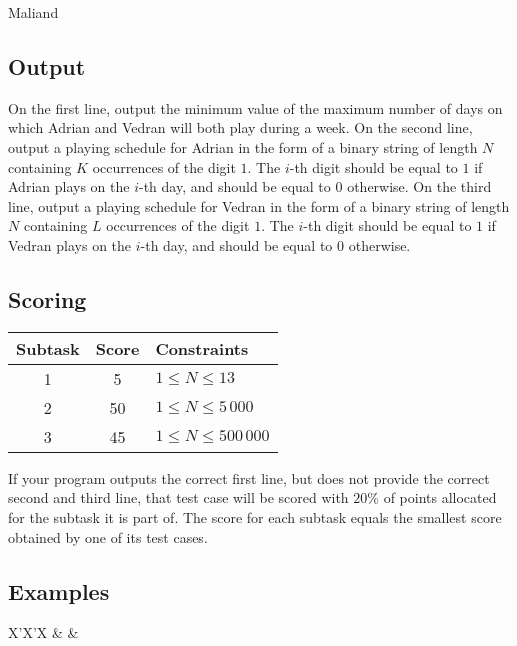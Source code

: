 \begin{statement}[
  problempoints=100,
  timelimit=2 seconds,
  memorylimit=512 MiB,
]{Maliand}
\subsection*{Output}

On the first line, output the minimum value of the maximum number of days on which Adrian and Vedran will both play during a week. On the second line, output a playing schedule for Adrian in the form of a binary string of length $N$ containing $K$ occurrences of the digit $1$. The $i$-th digit should be equal to $1$ if Adrian plays on the $i$-th day, and should be equal to $0$ otherwise. On the third line, output a playing schedule for Vedran in the form of a binary string of length $N$ containing $L$ occurrences of the digit $1$. The $i$-th digit should be equal to $1$ if Vedran plays on the $i$-th day, and should be equal to $0$ otherwise.

\subsection*{Scoring}
{\renewcommand{\arraystretch}{1.4}
  \setlength{\tabcolsep}{6pt}
  \begin{tabular}{ccl}
 Subtask & Score & Constraints \\ \midrule
  1 & 5 & $1 \le N \le 13$\\
  2 & 50 & $1 \le N \le 5\,000$\\
  3 & 45 & $1 \le N \le 500\,000$\\
\end{tabular}}

If your program outputs the correct first line, but does not provide the correct second and third line, that test case will be scored with $20\%$ of points allocated for the subtask it is part of. The score for each subtask equals the smallest score obtained by one of its test cases.

\subsection*{Examples}
\begin{tabularx}{\textwidth}{X'X'X}
 &
 &
\end{tabularx}


\end{statement}
